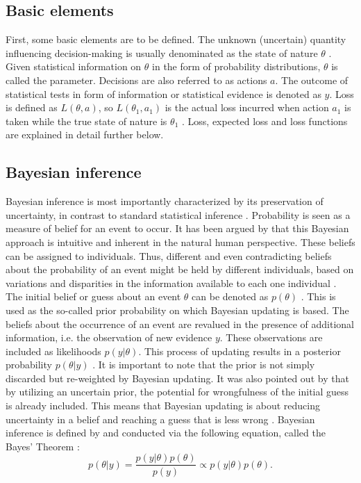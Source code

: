 	    \subsection{Basic elements}
	    First, some basic elements are to be defined. The unknown (uncertain) quantity influencing decision-making is usually denominated as the state of nature $\theta$ \citep{berger2013stat}. Given statistical information on $\theta$ in the form of probability distributions, $\theta$ is called the parameter. 
	    Decisions are also referred to as actions $a$.
	    The outcome of statistical tests in form of information or statistical evidence is denoted as $y$.	    
	    Loss is defined as $L(\theta,a)$, so $L(\theta_1,a_1)$ is the actual loss incurred when action $a_1$ is taken while the true state of nature is $\theta_1$ \citep{berger2013stat}. Loss, expected loss and loss functions are explained in detail further below.  
        
        \subsection{Bayesian inference}
        Bayesian inference is most importantly characterized by its preservation of uncertainty, in contrast to standard statistical inference \citep{davidson2015}. Probability is seen as a measure of belief for an event to occur. It has been argued by \cite{davidson2015}  that this Bayesian approach is intuitive and inherent in the natural human perspective. These beliefs can be assigned to individuals. Thus, different and even contradicting beliefs about the probability of an event might be held by different individuals, based on variations and disparities in the information available to each one individual \citep{davidson2015}.\\
        The initial belief or guess about an event $\theta$ can be denoted as $p(\theta)$ \citep{davidson2015, delaVarga2016}. This is used as the so-called prior probability on which Bayesian updating is based. The beliefs about the occurrence of an event are revalued in the presence of additional information, i.e. the observation of new evidence $y$. These observations are included as likelihoods $p(y|\theta)$. This process of updating results in a posterior probability $p(\theta|y)$ \citep{davidson2015, delaVarga2016}. It is important to note that the prior is not simply discarded but re-weighted by Bayesian updating. It was also pointed out by \citet{davidson2015} that by utilizing an uncertain prior, the potential for wrongfulness of the initial guess is already included. This means that Bayesian updating is about reducing uncertainty in a belief and reaching a guess that is less wrong \citep{davidson2015}.
        Bayesian inference is defined by and conducted via the following equation, called the Bayes' Theorem \citep{davidson2015}:
        \begin{equation}\label{eq:BayesTheorem}
        p(\theta|y) = \frac{p(y|\theta)p(\theta)}{p(y)}
        \propto p(y|\theta)p(\theta).
        \end{equation}
                
